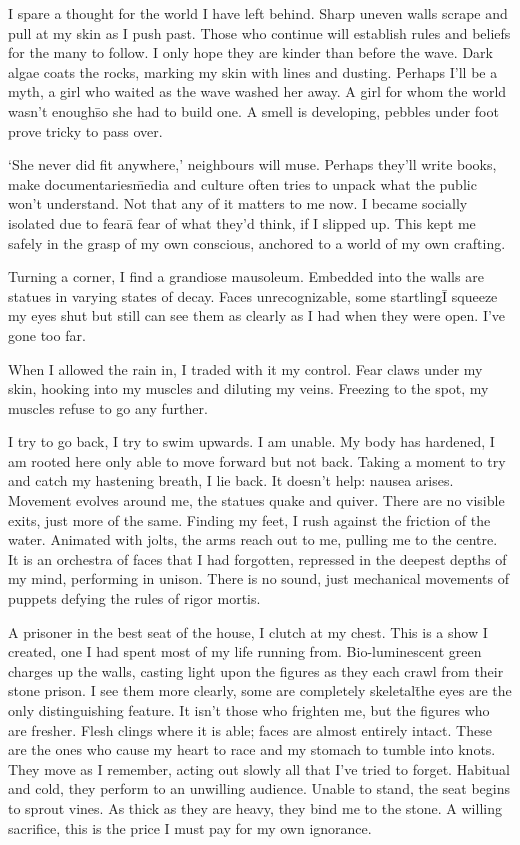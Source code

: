 I spare a thought for the world I have left behind. Sharp uneven walls
scrape and pull at my skin as I push past. Those who continue will
establish rules and beliefs for the many to follow. I only hope they
are kinder than before the wave. Dark algae coats the rocks, marking
my skin with lines and dusting. Perhaps I'll be a myth, a girl who
waited as the wave washed her away. A girl for whom the world wasn't
enough\=so she had to build one. A smell is developing, pebbles under
foot prove tricky to pass over.

`She never did fit anywhere,' neighbours will muse.  Perhaps they'll
write books, make documentaries\=media and culture often tries to
unpack what the public won't understand. Not that any of it matters to
me now. I became socially isolated due to fear\=a fear of what they'd
think, if I slipped up. This kept me safely in the grasp of my own
conscious, anchored to a world of my own crafting.

Turning a corner, I find a grandiose mausoleum. Embedded into the
walls are statues in varying states of decay. Faces unrecognizable,
some startling\=I squeeze my eyes shut but still can see them as clearly
as I had when they were open. I've gone too far.

When I allowed the rain in, I traded with it my control. Fear claws
under my skin, hooking into my muscles and diluting my veins. Freezing
to the spot, my muscles refuse to go any further.

I try to go back, I try to swim upwards. I am unable. My body has
hardened, I am rooted here only able to move forward but not
back. Taking a moment to try and catch my hastening breath, I lie
back. It doesn't help: nausea arises. Movement evolves around me, the
statues quake and quiver. There are no visible exits, just more of the
same. Finding my feet, I rush against the friction of the
water. Animated with jolts, the arms reach out to me, pulling me to
the centre. It is an orchestra of faces that I had forgotten, repressed in the
deepest depths of my mind, performing in unison. There is no sound, just
mechanical movements of puppets defying the rules of rigor mortis.

A prisoner in the best seat of the house, I clutch at my chest. This is a show I
created, one I had spent most of my life running from. Bio-luminescent
green charges up the walls, casting light upon the figures as they
each crawl from their stone prison. I see them more clearly, some are
completely skeletal\=the eyes are the only distinguishing feature. It
isn't those who frighten me, but the figures who are fresher. Flesh
clings where it is able; faces are almost entirely intact. These are the
ones who cause my heart to race and my stomach to tumble into
knots. They move as I remember, acting out slowly all that I've tried to
forget. Habitual and cold, they perform to an unwilling audience.
Unable to stand, the seat begins to sprout vines. As thick as they are
heavy, they bind me to the stone. A willing sacrifice, this is the price I
must pay for my own ignorance.

